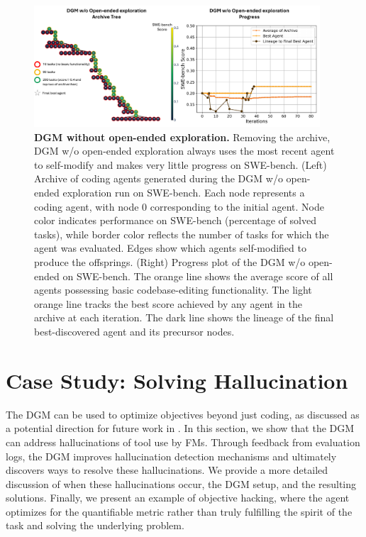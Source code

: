 \documentclass{article}
\begin{document}
\begin{figure}[H]
    \centering
    \includegraphics[width=0.95\textwidth]{figures/dgm_wo_openended.pdf}
    \caption{\textbf{DGM without open-ended exploration.} Removing the archive, DGM w/o open-ended exploration always uses the most recent agent to self-modify and makes very little progress on SWE-bench. (Left) Archive of coding agents generated during the DGM w/o open-ended exploration run on SWE-bench. Each node represents a coding agent, with node 0 corresponding to the initial agent. Node color indicates performance on SWE-bench (percentage of solved tasks), while border color reflects the number of tasks for which the agent was evaluated. Edges show which agents self-modified to produce the offsprings. (Right) Progress plot of the DGM w/o open-ended on SWE-bench. The orange line shows the average score of all agents possessing basic codebase-editing functionality. The light orange line tracks the best score achieved by any agent in the archive at each iteration. The dark line shows the lineage of the final best-discovered agent and its precursor nodes.}
    \label{fig:dgm-no-openended}
\end{figure}



\section{Case Study: Solving Hallucination}
\label{app:dgm-halluc}
The DGM can be used to optimize objectives beyond just coding, as discussed as a potential direction for future work in . In this section, we show that the DGM can address hallucinations of tool use by FMs. Through feedback from evaluation logs, the DGM improves hallucination detection mechanisms and ultimately discovers ways to resolve these hallucinations. We provide a more detailed discussion of when these hallucinations occur, the DGM setup, and the resulting solutions. Finally, we present an example of objective hacking, where the agent optimizes for the quantifiable metric rather than truly fulfilling the spirit of the task and solving the underlying problem.
\end{document}
